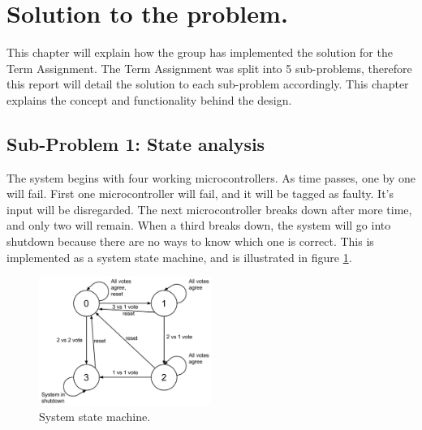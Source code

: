 \documentclass[a4paper]{IEEEtran}
\begin{document}
\section{ Solution to the problem.}
This chapter will explain how the group has implemented the solution for the Term Assignment.
The Term Assignment was split into 5 sub-problems, therefore this report will detail the solution to each sub-problem accordingly.
This chapter explains the concept and functionality behind the design.

\subsection{Sub-Problem 1: State analysis}

The system begins with four working microcontrollers.
As time passes, one by one will fail.
First one microcontroller will fail, and it will be tagged as faulty.
It's input will be disregarded.
The next microcontroller breaks down after more time, and only two will remain.
When a third breaks down, the system will go into shutdown because there are no ways to know which one is correct.
This is implemented as a system state machine, and is illustrated in figure \ref{fig:StateMachine}.
\begin{figure}[h!]
    \centering
    \includegraphics[width=0.5\textwidth]{Figures/Solution/StateMachine}
    \caption{System state machine.}
    \label{fig:StateMachine}
\end{figure}
\end{document}
